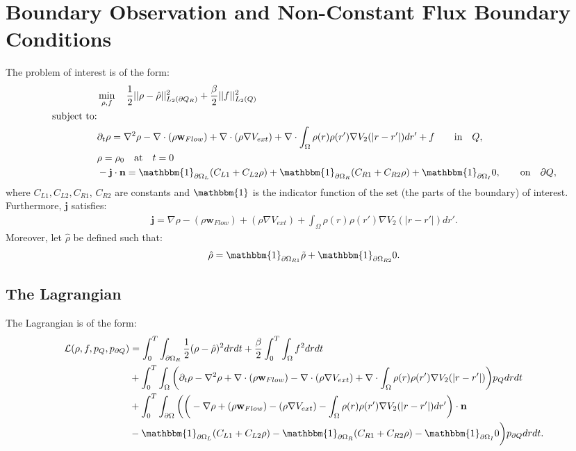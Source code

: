 \documentclass[11pt, a4paper]{article}
\newcommand{\Sta}{\rho}
\newcommand{\Adja}{{p}_Q}
\newcommand{\Adjc}{p_{\partial Q}}
\newcommand{\Con}{{f}}
\newcommand{\nor}{\mathbf{n}}
\theoremstyle{definition}
\begin{document}
\section{Boundary Observation and Non-Constant Flux Boundary Conditions}
The problem of interest is of the form:
\begin{align*}
&\min_{\Sta, \Con} \quad \frac{1}{2}|| \Sta -\hat \Sta||^2_{L_2(\partial Q_R)} + \frac{\beta}{2}|| \Con||^2_{L_2(Q)}\\
\text{subject to:}\\
&\partial_t \rho = \nabla^2 \rho - \nabla \cdot (\rho \mathbf{w}_{Flow}) +\nabla \cdot (\rho \nabla V_{ext}) + \nabla \cdot \int_\Omega \rho(r) \rho(r') \nabla V_2(|r-r'|) dr' + \Con \quad  \quad\text{in} \quad Q,\notag\\
& \rho = \rho_0 \quad \text{at} \quad t=0 \notag\\
& - \mathbf{j} \cdot \nor = \mathbbm{1}_{\partial \Omega_L}( C_{L1}  + C_{L2}\Sta) +\mathbbm{1}_{\partial \Omega_R} ( C_{R1}  + C_{R2}\Sta) +\mathbbm{1}_{\partial \Omega_I} 0, \quad  \quad\text{on} \quad \partial Q, 
\end{align*}
where $C_{L1}, C_{L2}, C_{R1}$, $C_{R2}$ are constants and $\mathbbm{1}$ is the indicator function of the set (the parts of the boundary) of interest.
Furthermore, $\mathbf{j}$ satisfies:
\begin{align*}
\mathbf{j}=\nabla \rho - (\rho \mathbf{w}_{Flow}) +(\rho \nabla V_{ext}) +  \int_\Omega \rho(r) \rho(r') \nabla V_2(|r-r'|) dr'.
\end{align*}
Moreover, let $\hat \Sta$ be defined such that:
\begin{align*}
\hat \Sta = \mathbbm{1}_{\partial \Omega_{R1}} \tilde \Sta  +\mathbbm{1}_{\partial \Omega_{R2}} 0.
\end{align*}

\subsection*{The Lagrangian}
The Lagrangian is of the form:
\begin{align*}
\mathcal{L}(\Sta,\Con,\Adja,\Adjc ) &= \int_0^T \int_{\partial \Omega_R} \frac{1}{2}(\Sta - \hat \Sta)^2 dr dt + \frac{\beta}{2}\int_0^T \int_\Omega \Con^2 drdt \\
&+ \int_0^T \int_\Omega \bigg( \partial_t \rho - \nabla^2 \rho + \nabla \cdot (\rho \mathbf{w}_{Flow}) -\nabla \cdot (\rho \nabla V_{ext}) + \nabla \cdot \int_\Omega \rho(r) \rho(r') \nabla V_2(|r-r'|) \bigg) \Adja dr dt\\
&+ \int_0^T \int_{\partial \Omega} \bigg(  \bigg(-\nabla \rho+ (\rho \mathbf{w}_{Flow}) -(\rho \nabla V_{ext}) -  \int_\Omega \rho(r) \rho(r') \nabla V_2(|r-r'|) dr' \bigg)\cdot \nor\\
&  -\mathbbm{1}_{\partial \Omega_L}( C_{L1}  + C_{L2}\Sta) -\mathbbm{1}_{\partial \Omega_R} ( C_{R1}  + C_{R2}\Sta) -\mathbbm{1}_{\partial \Omega_I} 0 \bigg) \Adjc dr dt.
\end{align*}
\end{document}
